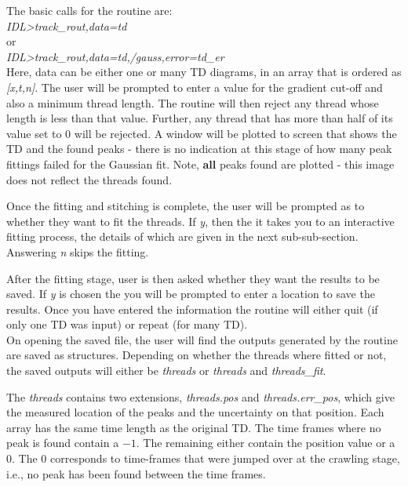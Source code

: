 \documentclass{article}
\begin{document}
The basic calls for the routine are: \\

\textit{IDL\textgreater track\_rout,data=td} \\

or\\

\textit{IDL\textgreater track\_rout,data=td,/gauss,error=td\_er} \\

 

Here, data can be either one or many TD diagrams, in an array that is ordered as \textit{[x,t,n]}.
The user will be prompted to enter a value for the gradient cut-off and also a minimum thread length. 
The routine will then reject any thread whose length is less than that value. Further, any thread that has 
more than half of its value set to 0 will be rejected. A window will be plotted to 
screen that shows the TD and the found peaks - there is no indication at this stage of how many peak 
fittings failed for the Gaussian fit. Note, \textbf{all} peaks found are plotted - this image does not reflect 
the threads found.

Once the fitting and stitching is complete, the user will be prompted as to whether they want to fit the 
threads. If \textit{y}, then the it takes you to an interactive fitting process, the details of which are given 
in the next sub-sub-section. Answering \textit{n} skips the fitting.

After the fitting stage, user is then asked whether they want the results to be saved. If \textit{y} is chosen 
the you will be prompted to enter a location to save the results. Once you have entered the information 
the routine will either quit (if only one TD was input) or repeat (for many TD).\\

On opening the saved file, the user will find the outputs generated by the routine are saved as structures. 
Depending on whether the threads where fitted or not, the saved outputs will either be \textit{threads} or 
\textit{threads} and \textit{threads\_fit}.

The \textit{threads} contains two extensions, \textit{threads.pos} and \textit{threads.err\_pos}, which 
give the measured location of the peaks and the uncertainty on that position. Each array has the same 
time length as the original TD. The time frames where no peak is found contain a $-1$. The remaining 
either contain the position value or a 0. The 0 corresponds to time-frames that were jumped over at the
crawling stage, i.e., no peak has been found between the time frames. \\
\end{document}
